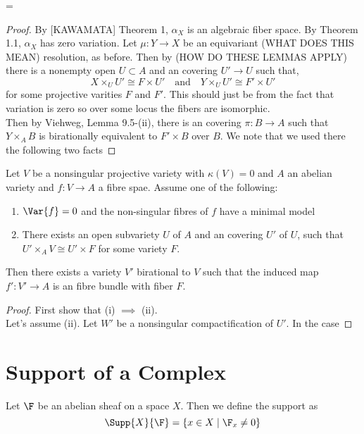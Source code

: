 =\documentclass[12pt]{article}
\begin{document}
\begin{proof}
By [KAWAMATA] Theorem 1, $\alpha_X$ is an algebraic fiber space. By Theorem 1.1, $\alpha_X$ has zero variation. Let $\mu : Y \to X$ be an equivariant (WHAT DOES THIS MEAN) resolution, as before. Then by (HOW DO THESE LEMMAS APPLY) there is a nonempty open $U \subset A$ and an \etale covering $U' \to U$ such that,
\[ X \times_U U' \cong F \times U' \quad \text{and} \quad Y \times_U U' \cong F' \times U' \]
for some projective varities $F$ and $F'$. This should just be from the fact that variation is zero so over some locus the fibers are isomorphic. 
\bigskip\\
Then by Viehweg, Lemma 9.5-(ii), there is an \etale covering $\pi : B \to A$ such that $Y \times_A B$ is birationally equivalent to $F' \times B$ over $B$. We note that we used there the following two facts
\end{proof}

\begin{lemma}
Let $V$ be a nonsingular projective variety with $\kappa(V) = 0$ and $A$ an abelian variety and $f : V \to A$ a fibre spae. Assume one of the following:
\begin{enumerate}
\item $\Var{f} = 0$ and the non-singular fibres of $f$ have a minimal model
\item There exists an open subvariety $U$ of $A$ and an \etale covering $U'$ of $U$, such that $U' \times_A V \cong U' \times F$ for some variety $F$.
\end{enumerate}
Then there exists a variety $V'$ birational to $V$ such that the induced map $f' : V' \to A$ is an \etale fibre bundle with fiber $F$.
\end{lemma}

\begin{proof}
First show that (i) $\implies$ (ii).
\bigskip\\
Let's assume (ii). Let $W'$ be a nonsingular compactification of $U'$. In the case
\end{proof}


\section{Support of a Complex}

\begin{defn}
Let $\F$ be an abelian sheaf on a space $X$. Then we define the support as
\[ \Supp{X}{\F} = \{ x \in X \mid \F_x \neq 0 \} \]
\end{defn}
\end{document}
